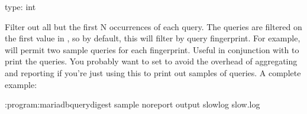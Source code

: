 \documentclass[letterpaper,10pt,english]{sphinxmanual}
\begin{document}

\begin{fulllineitems}
\label{\detokenize{mariadb-query-digest:cmdoption-mariadb-query-digest-sample}}
type: int

Filter out all but the first N occurrences of each query.  The queries are
filtered on the first value in {\hyperref[\detokenize{mariadb-query-digest:cmdoption-mariadb-query-digest-group-by}]{}}, so by default, this will filter
by query fingerprint.  For example,  will permit two sample queries
for each fingerprint.  Useful in conjunction with  to print
the queries.  You probably want to set  to avoid the overhead of
aggregating and reporting if you’re just using this to print out samples of
queries.  A complete example:

\begin{sphinxVerbatim}[commandchars=\\\{\}]
:program:mariadb\PYGZhy{}query\PYGZhy{}digest \PYGZhy{}\PYGZhy{}sample  \PYGZhy{}\PYGZhy{}no\PYGZhy{}report \PYGZhy{}\PYGZhy{}output slowlog slow.log
\end{sphinxVerbatim}

\end{fulllineitems}

\end{document}

